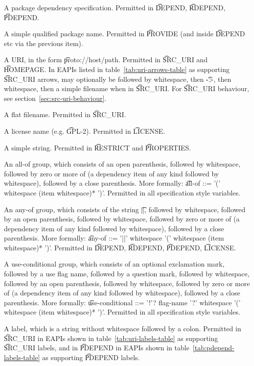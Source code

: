 \begin{compactitem}
\item A package dependency specification. Permitted in \t{DEPEND}, \t{RDEPEND}, \t{PDEPEND}.
\item A simple qualified package name. Permitted in \t{PROVIDE} (and inside \t{DEPEND} etc
    via the previous item).
\item A URI, in the form \t{proto://host/path}. Permitted in \t{SRC\_URI} and \t{HOMEPAGE}. In EAPIs
    listed in table~\ref{tab:uri-arrows-table} as supporting \t{SRC\_URI} arrows, may optionally be
    followed by whitespace, then \t{->}, then whitespace, then a simple filename when in
    \t{SRC\_URI}.  For \t{SRC\_URI} behaviour, see section~\ref{sec:src-uri-behaviour}.
\item A flat filename. Permitted in \t{SRC\_URI}.
\item A license name (e.g. \t{GPL-2}). Permitted in \t{LICENSE}.
\item A simple string. Permitted in \t{RESTRICT} and \t{PROPERTIES}.
\item An all-of group, which consists of an open parenthesis, followed by whitespace,
    followed by zero or more of (a dependency item of any kind followed by whitespace), followed
    by a close parenthesis. More formally:
    \t{all-of ::= '(' whitespace (item whitespace)* ')'}. Permitted in all specification style
    variables.
\item An any-of group, which consists of the string \t{||}, followed by whitespace,
    followed by an open parenthesis, followed by whitespace, followed by zero or more
    of (a dependency item of any kind followed by whitespace), followed by a close parenthesis.
    More formally: \t{any-of ::= '||' whitespace '(' whitespace (item whitespace)* ')'}.
    Permitted in \t{DEPEND}, \t{RDEPEND}, \t{PDEPEND}, \t{LICENSE}.
\item A use-conditional group, which consists of an optional exclamation mark, followed by
    a use flag name, followed by a question mark, followed by whitespace, followed by
    an open parenthesis, followed by whitespace, followed by zero or more of (a dependency item
    of any kind followed by whitespace), followed by a close parenthesis. More formally:
    \t{use-conditional ::= '!'? flag-name '?' whitespace '(' whitespace (item whitespace)* ')'}.
    Permitted in all specification style variables.
\IFKDEBUILDELSE
{
    \item A label, which is a string without whitespace followed by a colon. Permitted in
    \t{SRC\_URI} in EAPIs shown in table~\ref{tab:uri-labels-table} as supporting \t{SRC\_URI} labels,
    and in \t{PDEPEND} in EAPIs shown in table~\ref{tab:pdepend-labels-table} as supporting \t{PDEPEND}
    labels.
}{
}
\end{compactitem}

